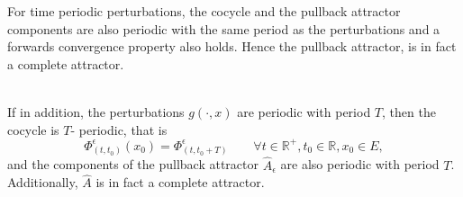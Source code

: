For time periodic perturbations, the cocycle and the pullback attractor
components are also periodic with the same period as the perturbations and
a forwards convergence property also holds. Hence the pullback attractor,
is in fact a complete attractor.

\begin{cor} \label{pnpertcor} \hfill
                        \\
If in addition, the perturbations $g(\cdot,x)$ are periodic with period
$T$, then the cocycle is $T$- periodic, that is
\[ \Phi^{\epsilon}_{(t,t_0)}(x_0) = \Phi^{\epsilon}_{(t,t_0+T)} \qquad
        \forall t \in \mathbb{R}^+, t_0 \in \mathbb{R}, x_0 \in E, \]
and the components of the pullback attractor $\hat{A}_{\epsilon}$ are also
periodic with period $T$. Additionally, $\hat{A}$ is in fact a complete
attractor.
\end{cor}
